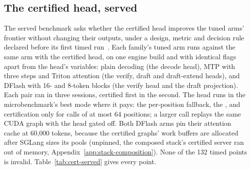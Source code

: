 \subsection{The certified head, served}\label{app:cert-served}
The served benchmark asks whether the certified head improves the tuned arms' frontier without changing their outputs, under a design, metric and decision rule declared before its first timed run~. Each family's tuned arm runs against the same arm with the certified head, on one engine build and with identical flags apart from the head's variables: plain decoding (the decode head), MTP with three steps and Triton attention (the verify, draft and draft-extend heads), and DFlash with 16- and 8-token blocks (the verify head and the draft projection). Each pair ran in three sessions, certified first in the second. The head runs in the microbenchmark's best mode where it pays: the per-position fallback, the \modelcons{}, and certification only for calls of at most 64 positions; a larger call replays the same CUDA graph with the head gated off. Both DFlash arms pin their attention cache at 60,000 tokens, because the certified graphs' work buffers are allocated after SGLang sizes its pools (unpinned, the composed stack's certified server ran out of memory, Appendix~\ref{app:stack-composition}). None of the 132 timed points is invalid. Table~\ref{tab:cert-served} gives every point.

